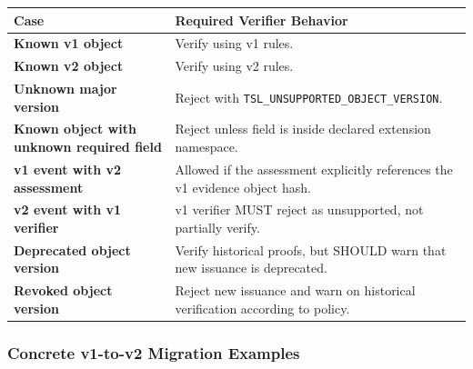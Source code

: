 \documentclass[11pt]{article}
\begin{document}
\begin{center}
\begin{tabularx}{\textwidth}{>{\bfseries}p{} X}
\toprule
Case & Required Verifier Behavior \\
\midrule
Known v1 object & Verify using v1 rules. \\
Known v2 object & Verify using v2 rules. \\
Unknown major version & Reject with \texttt{TSL\_UNSUPPORTED\_OBJECT\_VERSION}. \\
Known object with unknown required field & Reject unless field is inside declared extension namespace. \\
v1 event with v2 assessment & Allowed if the assessment explicitly references the v1 evidence object hash. \\
v2 event with v1 verifier & v1 verifier MUST reject as unsupported, not partially verify. \\
Deprecated object version & Verify historical proofs, but SHOULD warn that new issuance is deprecated. \\
Revoked object version & Reject new issuance and warn on historical verification according to policy. \\
\bottomrule
\end{tabularx}
\end{center}



\subsubsection{Concrete v1-to-v2 Migration Examples}
\end{document}

